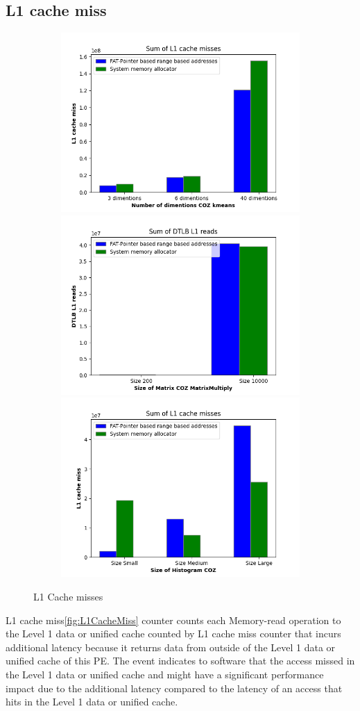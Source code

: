 \subsection{L1 cache miss}
\begin{figure}
  \begin{subfigure}{\linewidth}
    \includegraphics[width=.5\linewidth]{l1-miss-kmeans.png}\hfill
    \includegraphics[width=.5\linewidth]{l1-miss-matrixmultiply.png}\hfill
    \includegraphics[width=.5\linewidth]{l1-miss-histogram.png}
\end{subfigure}
\caption{L1 Cache misses}
\label{L1CacheMiss}
\end{figure}
L1 cache miss\ref{fig:L1CacheMiss} counter counts each Memory-read operation to the Level 1 data or unified cache counted by L1 cache miss counter that incurs additional latency because it returns data from outside of the Level 1 data or unified cache of this PE.
The event indicates to software that the access missed in the Level 1 data or unified cache and might have a significant performance impact due to the additional latency compared to the latency of an access that hits in the Level 1 data or unified cache.
\newline


